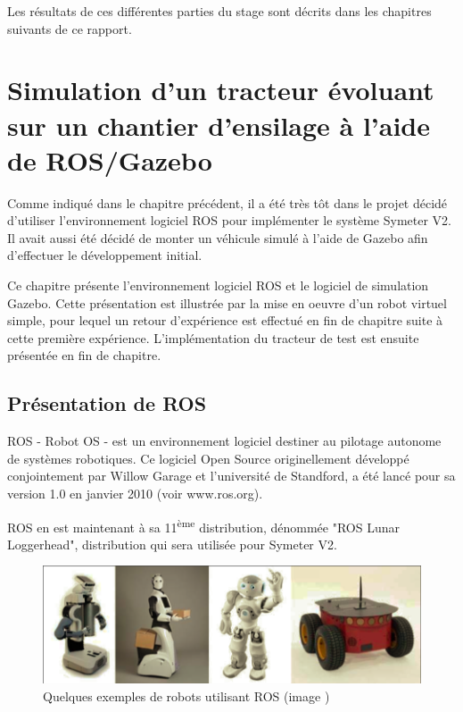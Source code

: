 \documentclass[12pt,a4paper]{report}
\begin{document}
	\para Les résultats de ces différentes parties du stage sont décrits dans les chapitres suivants de ce rapport.
				

\chapter{Simulation d'un tracteur évoluant sur un chantier d'ensilage à l'aide de ROS/Gazebo}
\label{chap-simu-ros-gazebo}

Comme indiqué dans le chapitre précédent, il a été très tôt dans le projet décidé d'utiliser l'environnement logiciel ROS pour implémenter le système Symeter V2. Il avait aussi été décidé de monter un véhicule simulé à l'aide de Gazebo afin d'effectuer le développement initial.

\para Ce chapitre présente l'environnement logiciel ROS et le logiciel de simulation Gazebo. Cette présentation est illustrée par la mise en oeuvre d'un robot virtuel simple, pour lequel un retour d'expérience est effectué en fin de chapitre suite à cette première expérience. L'implémentation du tracteur de test est ensuite présentée en fin de chapitre.

	\section{Présentation de ROS}
	
	ROS - Robot OS - est un environnement logiciel destiner au pilotage autonome de systèmes robotiques. Ce logiciel Open Source originellement développé conjointement par Willow Garage et l'université de Standford, a été lancé pour sa version 1.0 en janvier 2010 (voir www.ros.org).
	
	\para ROS en est maintenant à sa 11\textsuperscript{ème} distribution, dénommée "ROS Lunar Loggerhead", distribution qui sera utilisée pour Symeter V2.
	
	\begin{figure}[h!]
		\centering
		\includegraphics[width=0.7\linewidth]{img/robotsros}
		\caption[robotsros]{Quelques exemples de robots utilisant ROS (image \cite{martinez_learning_2013})}
		\label{fig:robotsros}
	\end{figure}
	
\end{document}
